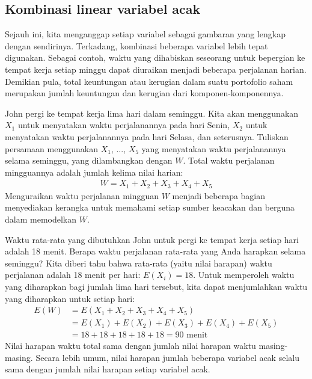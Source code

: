 \subsection{Kombinasi linear variabel acak}

Sejauh ini, kita menganggap setiap variabel sebagai gambaran yang lengkap dengan sendirinya. Terkadang, kombinasi beberapa variabel lebih tepat digunakan. Sebagai contoh, waktu yang dihabiskan seseorang untuk bepergian ke tempat kerja setiap minggu dapat diuraikan menjadi beberapa perjalanan harian. Demikian pula, total keuntungan atau kerugian dalam suatu portofolio saham merupakan jumlah keuntungan dan kerugian dari komponen-komponennya.

\begin{examplewrap}
\begin{nexample}{John pergi ke tempat kerja lima hari dalam seminggu. Kita akan menggunakan $X_1$ untuk menyatakan waktu perjalanannya pada hari Senin, $X_2$ untuk menyatakan waktu perjalanannya pada hari Selasa, dan seterusnya. Tuliskan persamaan menggunakan $X_1$, ..., $X_5$ yang menyatakan waktu perjalanannya selama seminggu, yang dilambangkan dengan $W$.}
Total waktu perjalanan mingguannya adalah jumlah kelima nilai harian:
\begin{align*}
W = X_1 + X_2 + X_3 + X_4 + X_5
\end{align*}
Menguraikan waktu perjalanan mingguan $W$ menjadi beberapa bagian menyediakan kerangka untuk memahami setiap sumber keacakan dan berguna dalam memodelkan $W$.
\end{nexample}
\end{examplewrap}

\D{\newpage}

\begin{examplewrap}
\begin{nexample}{Waktu rata-rata yang dibutuhkan John untuk pergi ke tempat kerja setiap hari adalah 18 menit. Berapa waktu perjalanan rata-rata yang Anda harapkan selama seminggu?}
Kita diberi tahu bahwa rata-rata (yaitu nilai harapan) waktu perjalanan adalah 18 menit per hari: $E(X_i) = 18$. Untuk memperoleh waktu yang diharapkan bagi jumlah lima hari tersebut, kita dapat menjumlahkan waktu yang diharapkan untuk setiap hari:
\begin{align*}
E(W) &= E(X_1 + X_2 + X_3 + X_4 + X_5) \\
	&= E(X_1) + E(X_2) + E(X_3) + E(X_4) + E(X_5) \\
	&= 18 + 18 + 18 + 18 + 18 = 90\text{ menit}
\end{align*}
Nilai harapan waktu total sama dengan jumlah nilai harapan waktu masing-masing. Secara lebih umum, nilai harapan jumlah beberapa variabel acak selalu sama dengan jumlah nilai harapan setiap variabel acak.
\end{nexample}
\end{examplewrap}

